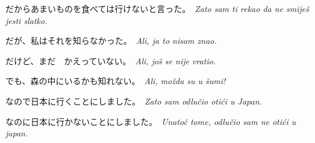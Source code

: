 \documentclass[12pt]{article}
\begin{document}
	だからあまいものを食べては行けないと言った。　\textit{Zato sam ti rekao da ne smiješ jesti slatko.}
	
	だが、私はそれを知らなかった。　\textit{Ali, ja to nisam znao.}
	
	だけど、まだ　かえっていない。　\textit{Ali, još se nije vratio.}\footnotemark[2]
	
	でも、森の中にいるかも知れない。　\textit{Ali, možda su u šumi!}
	
	なので日本に行くことにしました。　\textit{Zato sam odlučio otići u Japan.}
	
	なのに日本に行かないことにしました。　\textit{Unatoč tome, odlučio sam ne otići u japan.}
	
	
\end{document}
